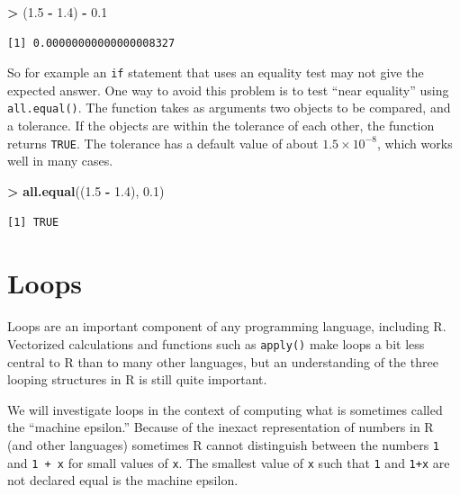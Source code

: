 \documentclass[]{krantz}
\makeatletter
\newenvironment{Shaded}{\begin{snugshade}}{\end{snugshade}}
\newcommand{\FloatTok}[1]{\textcolor[rgb]{0.06,0.06,0.06}{#1}}
\newcommand{\KeywordTok}[1]{\textcolor[rgb]{0.27,0.27,0.27}{\textbf{#1}}}
\newcommand{\NormalTok}[1]{#1}
\newcommand{\OperatorTok}[1]{\textcolor[rgb]{0.43,0.43,0.43}{\textbf{#1}}}
\newcommand{\StringTok}[1]{\textcolor[rgb]{0.5,0.5,0.5}{#1}}
\newenvironment{kframe}{%
\medskip{}
\setlength{\fboxsep}{.8em}
 \def\at@end@of@kframe{}%
 \ifinner\ifhmode%
  \def\at@end@of@kframe{\end{minipage}}%
  \begin{minipage}{\columnwidth}%
 \fi\fi%
 \def\FrameCommand##1{\hskip\@totalleftmargin \hskip-\fboxsep
 \colorbox{shadecolor}{##1}\hskip-\fboxsep
     \hskip-\linewidth \hskip-\@totalleftmargin \hskip\columnwidth}%
 \MakeFramed {\advance\hsize-\width
   \@totalleftmargin\z@ \linewidth\hsize
   \@setminipage}}%
 {\par\unskip\endMakeFramed%
 \at@end@of@kframe}
\renewenvironment{Shaded}{\begin{kframe}}{\end{kframe}}
\makeatother
\begin{document}
\begin{Shaded}
\begin{Highlighting}[]
\OperatorTok{>}\StringTok{ }\NormalTok{(}\FloatTok{1.5} \OperatorTok{-}\StringTok{ }\FloatTok{1.4}\NormalTok{) }\OperatorTok{-}\StringTok{ }\FloatTok{0.1}
\end{Highlighting}
\end{Shaded}

\begin{verbatim}
[1] 0.00000000000000008327
\end{verbatim}

So for example an \texttt{if} statement that uses an equality test may not give the expected answer. One way to avoid this problem is to test ``near equality'' using \texttt{all.equal()}. The function takes as arguments two objects to be compared, and a tolerance. If the objects are within the tolerance of each other, the function returns \texttt{TRUE}. The tolerance has a default value of about \(1.5\times 10^{-8}\), which works well in many cases.

\begin{Shaded}
\begin{Highlighting}[]
\OperatorTok{>}\StringTok{ }\KeywordTok{all.equal}\NormalTok{((}\FloatTok{1.5} \OperatorTok{-}\StringTok{ }\FloatTok{1.4}\NormalTok{), }\FloatTok{0.1}\NormalTok{)}
\end{Highlighting}
\end{Shaded}

\begin{verbatim}
[1] TRUE
\end{verbatim}

\hypertarget{loops}{%
\section{Loops}\label{loops}}

Loops are an important component of any programming language, including R. Vectorized calculations and functions such as \texttt{apply()} make loops a bit less central to R than to many other languages, but an understanding of the three looping structures in R is still quite important.

We will investigate loops in the context of computing what is sometimes called the ``machine epsilon.'' Because of the inexact representation of numbers in R (and other languages) sometimes R cannot distinguish between the numbers \texttt{1} and \texttt{\textbar{}1\ +\ x\textbar{}} for small values of \texttt{x}. The smallest value of \texttt{x} such that \texttt{1} and \texttt{\textbar{}1+x\textbar{}} are not declared equal is the machine epsilon.
\end{document}
